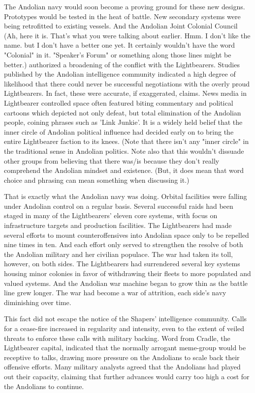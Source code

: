 \begin{itemize}
The Andolian navy would soon become a proving ground for these new
designs.  Prototypes would be tested in the heat of battle.  New
secondary systems were being retrofitted to existing vessels.  And the
Andolian Joint Colonial Council (Ah, here it is. That's what you were
talking about earlier. Hmm. I don't like the name. but I don't
have a better one yet. It certainly wouldn't have the word "Colonial" 
in it. "Speaker's Forum" or something along those lines might be
better.) authorized a broadening of the conflict with the
Lightbearers.  Studies published by the Andolian intelligence
community indicated a high degree of likelihood that there could never
be successful negotiations with the overly proud Lightbearers.  In
fact, these were accurate, if exaggerated, claims.  News media in
Lightbearer controlled space often featured biting commentary and
political cartoons which depicted not only defeat, but total
elimination of the Andolian people, coining phrases such as 'Link
Junkie'.  It is a widely held belief that the inner circle of Andolian
political influence had decided early on to bring the entire
Lightbearer faction to its knees. (Note that there isn't any "inner
circle" in the traditional sense in Andolian politics. Note also that
this wouldn't dissuade other groups from believing that there was/is
because they don't really comprehend the Andolian mindset and
existence. (But, it does mean that word choice and phrasing can mean
something when discussing it.)

That is exactly what the Andolian navy was doing.  Orbital facilities
were falling under Andolian control on a regular basis.  Several
successful raids had been staged in many of the Lightbearers' eleven
core systems, with focus on infrastructure targets and production
facilities.  The Lightbearers had made several efforts to mount
counteroffensives into Andolian space only to be repelled nine times
in ten.  And each effort only served to strengthen the resolve of both
the Andolian military and her civilian populace.  The war had taken
its toll, however, on both sides.  The Lightbearers had surrendered
several key systems housing minor colonies in favor of withdrawing
their fleets to more populated and valued systems.  And the Andolian
war machine began to grow thin as the battle line grew longer.  The
war had become a war of attrition, each side's navy diminishing over
time.

This fact did not escape the notice of the Shapers' intelligence
community.  Calls for a cease-fire increased in regularity and
intensity, even to the extent of veiled threats to enforce these calls
with military backing.  Word from Cradle, the Lightbearer capital,
indicated that the normally arrogant meme-group would be receptive to
talks, drawing more pressure on the Andolians to scale back their
offensive efforts.  Many military analysts agreed that the Andolians
had played out their capacity, claiming that further advances would
carry too high a cost for the Andolians to continue.
	

\end{itemize}
